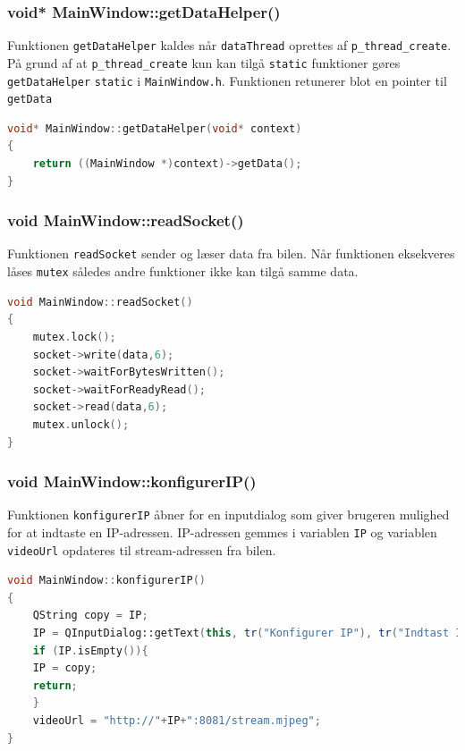 \subsubsection{void* MainWindow::getDataHelper()}
Funktionen \texttt{getDataHelper} kaldes når \texttt{dataThread} oprettes af \texttt{p\_thread\_create}. På grund af at \texttt{p\_thread\_create} kun kan tilgå \texttt{static} funktioner gøres \texttt{getDataHelper} \texttt{static} i \texttt{MainWindow.h}. Funktionen retunerer blot en pointer til \texttt{getData}
\begin{lstlisting}[caption={getDataHelper},label=lst:getDatahelper, language=c++]
void* MainWindow::getDataHelper(void* context)
{
    return ((MainWindow *)context)->getData();
}
\end{lstlisting}

\clearpage

\subsubsection{void MainWindow::readSocket()}
Funktionen \texttt{readSocket} sender og læser data fra bilen. Når funktionen eksekveres låses \texttt{mutex} således andre funktioner ikke kan tilgå samme data.


\begin{lstlisting}[caption={readSocket},label=lst:readSocket, language=c++]
void MainWindow::readSocket()
{   
    mutex.lock();
    socket->write(data,6);
    socket->waitForBytesWritten();
    socket->waitForReadyRead();
    socket->read(data,6);
    mutex.unlock();
}
\end{lstlisting}

\subsubsection{void MainWindow::konfigurerIP()}
Funktionen \texttt{konfigurerIP} åbner for en inputdialog som giver brugeren mulighed for at indtaste en IP-adressen. IP-adressen gemmes i variablen \texttt{IP} og variablen \texttt{videoUrl} opdateres til stream-adressen fra bilen.
\begin{lstlisting}[caption={konfigurerIP},label=lst:konfigurerIP, language=c++]
void MainWindow::konfigurerIP()
{
    QString copy = IP;
    IP = QInputDialog::getText(this, tr("Konfigurer IP"), tr("Indtast IP adressen"), QLineEdit::Normal,IP);
    if (IP.isEmpty()){
    IP = copy;
    return;
    }
    videoUrl = "http://"+IP+":8081/stream.mjpeg";
}
\end{lstlisting}

